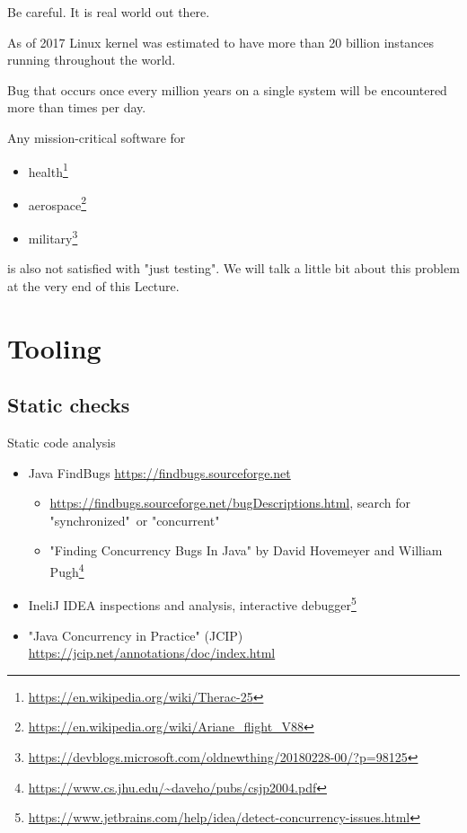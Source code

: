 \begin{frame}{Be careful. It is real world out there.}

As of 2017 Linux kernel was estimated to have more than 20 billion instances running throughout the world.

Bug that occurs once every million years on a single system will be encountered more than  times per day.

\pause

Any mission-critical software for
\begin{itemize}
  \item health\footnote<3->{\tiny\url{https://en.wikipedia.org/wiki/Therac-25}}
  \item aerospace\footnote<3->{\tiny\url{https://en.wikipedia.org/wiki/Ariane_flight_V88}}
  \item military\footnote<3->{\tiny\url{https://devblogs.microsoft.com/oldnewthing/20180228-00/?p=98125}}
\end{itemize}
is also not satisfied with "just testing". We will talk a little bit about this problem at the very end of this Lecture.
\end{frame}

\section{Tooling}
\showTOC

\subsection{Static checks}

\begin{frame}{Static code analysis}

\begin{itemize}
  \item Java FindBugs \url{https://findbugs.sourceforge.net}
  \begin{itemize}
    \item \url{https://findbugs.sourceforge.net/bugDescriptions.html}, search for "synchronized"\ or "concurrent"
    \item "Finding Concurrency Bugs In Java" by David Hovemeyer and William Pugh\footnote{\tiny\url{https://www.cs.jhu.edu/~daveho/pubs/csjp2004.pdf}}
  \end{itemize}

  \item IneliJ IDEA inspections and analysis, interactive debugger\footnote{\tiny\url{https://www.jetbrains.com/help/idea/detect-concurrency-issues.html}}

  \item "Java Concurrency in Practice" (JCIP) \url{https://jcip.net/annotations/doc/index.html}
\end{itemize}

\end{frame}

